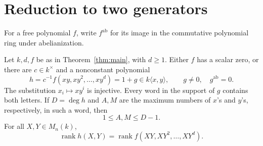 \documentclass{article}
\newcommand{\rank}{\operatorname{rank}}
\newcommand{\ab}{\mathrm{ab}}
\begin{document}
\section{Reduction to two generators}\label{sec:reduction}
For a free polynomial $f$, write $f^{\ab}$ for its image in the commutative polynomial ring under abelianization.

\begin{lemma}\label{lem:reduction}
Let $k,d,f$ be as in Theorem~\ref{thm:main}, with $d\geq1$. Either $f$ has a scalar zero, or there are $c\in k^\times$ and a nonconstant polynomial
\[
 h=c^{-1}f(xy,xy^2,\ldots,xy^d)=1+g\in k\langle x,y\rangle,
 \qquad g\ne0,\quad g^{\ab}=0.
\]
The substitution $x_i\mapsto xy^i$ is injective. Every word in the support of $g$ contains both letters. If $D=\deg h$ and $A,M$ are the maximum numbers of $x$'s and $y$'s, respectively, in such a word, then
\[
 1\leq A,M\leq D-1.
\]
For all $X,Y\in M_n(k)$,
\[
 \rank h(X,Y)=\rank f(XY,XY^2,\ldots,XY^d).
\]
\end{lemma}
\end{document}
